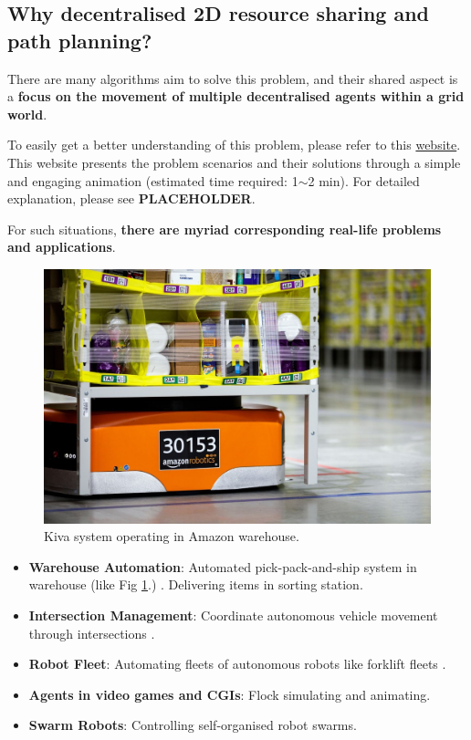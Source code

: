 \subsection{Why decentralised 2D resource sharing and path planning?}

There are many algorithms aim to solve this problem, and their shared aspect is a \textbf{focus on the movement of multiple decentralised agents within a grid world}. 

To easily get a better understanding of this problem, please refer to this \href{https://primalgrid.netlify.app/primal}{website}\footnotemark. 
This website presents the problem scenarios and their solutions through a simple and engaging animation (estimated time required: 1$\sim$2 min). 
For detailed explanation, please see \textbf{PLACEHOLDER}.

For such situations, \textbf{there are myriad corresponding real-life problems and applications}.

\begin{figure}
    \centering
    \includegraphics[width=0.6\linewidth]{figures/Amazon_Warehouse.jpeg}
    \caption{Kiva system operating in Amazon warehouse.\protect\footnotemark}
    \label{fig:Amazon Warehouse Robots}
\end{figure}



\begin{itemize}
    \item \textbf{Warehouse Automation}: Automated pick-pack-and-ship system in warehouse (like Fig \ref{fig:Amazon Warehouse Robots}.) \cite{Amazon_Kiva}. Delivering items in sorting station\cite{Warehouse_Automation1,Warehouse_Automation2}.
    \item \textbf{Intersection Management}: Coordinate autonomous vehicle movement through intersections \cite{Intersection_Management}.
    \item \textbf{Robot Fleet}: Automating fleets of autonomous robots like forklift fleets \cite{Fork_Fleet1,Fork_Fleet2}.  
    \item \textbf{Agents in video games and CGIs}: Flock simulating and animating\cite{Flocking_1,Flocking_2}.
    \item \textbf{Swarm Robots}: Controlling self-organised robot swarms\cite{Swarm_Robotics}.
\end{itemize}

